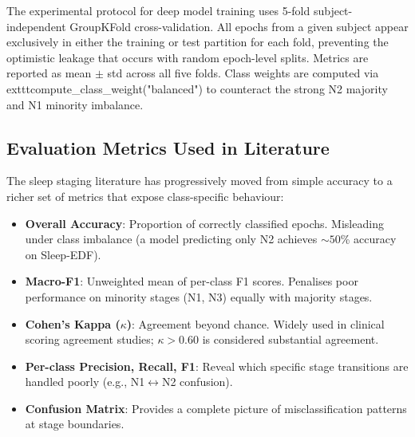 \documentclass[10pt]{article}
\begin{document}
The experimental protocol for deep model training uses 5-fold subject-independent GroupKFold cross-validation. All epochs from a given subject appear exclusively in either the training or test partition for each fold, preventing the optimistic leakage that occurs with random epoch-level splits. Metrics are reported as mean $\pm$ std across all five folds. Class weights are computed via 	exttt{compute\_class\_weight("balanced")} to counteract the strong N2 majority and N1 minority imbalance.

\subsection{Evaluation Metrics Used in Literature}
\label{sec:metrics}

The sleep staging literature has progressively moved from simple accuracy to a richer set of metrics that expose class-specific behaviour:

\begin{itemize}
  \item \textbf{Overall Accuracy}: Proportion of correctly classified epochs. Misleading under class imbalance (a model predicting only N2 achieves $\sim50$\% accuracy on Sleep-EDF).
  \item \textbf{Macro-F1}: Unweighted mean of per-class F1 scores. Penalises poor performance on minority stages (N1, N3) equally with majority stages.
  \item \textbf{Cohen's Kappa ($\kappa$)}: Agreement beyond chance. Widely used in clinical scoring agreement studies; $\kappa > 0.60$ is considered substantial agreement.
  \item \textbf{Per-class Precision, Recall, F1}: Reveal which specific stage transitions are handled poorly (e.g., N1$\leftrightarrow$N2 confusion).
  \item \textbf{Confusion Matrix}: Provides a complete picture of misclassification patterns at stage boundaries.
\end{itemize}
\end{document}
